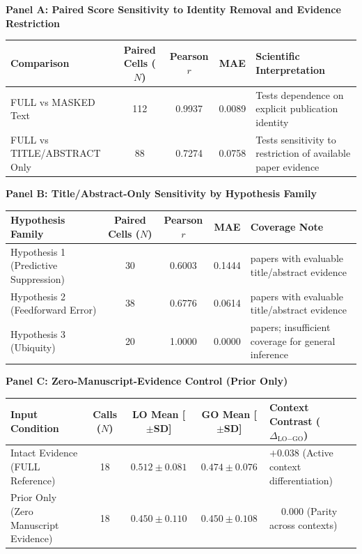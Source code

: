 \documentclass[12pt]{article}
\begin{document}
\vspace{1.5em}

\begingroup
\small
\noindent\textbf{Panel A: Paired Score Sensitivity to Identity Removal and Evidence Restriction}
\vspace{0.2em}

\noindent\begin{tabularx}{\textwidth}{@{}l c c c >{\raggedright\arraybackslash}X@{}}
\toprule
\textbf{Comparison} & \textbf{Paired Cells ($N$)} & \textbf{Pearson $r$} & \textbf{MAE} & \textbf{Scientific Interpretation} \\
\midrule
FULL vs MASKED Text & 112 & 0.9937 & 0.0089 & Tests dependence on explicit publication identity \\
FULL vs TITLE/ABSTRACT Only & 88 & 0.7274 & 0.0758 & Tests sensitivity to restriction of available paper evidence \\
\bottomrule
\end{tabularx}

\vspace{0.8em}
\noindent\textbf{Panel B: Title/Abstract-Only Sensitivity by Hypothesis Family}
\vspace{0.2em}

\noindent\begin{tabularx}{\textwidth}{@{}l c c c >{\raggedright\arraybackslash}X@{}}
\toprule
\textbf{Hypothesis Family} & \textbf{Paired Cells ($N$)} & \textbf{Pearson $r$} & \textbf{MAE} & \textbf{Coverage Note} \\
\midrule
Hypothesis 1 (Predictive Suppression) & 30 & 0.6003 & 0.1444 & 5 papers with evaluable title/abstract evidence \\
Hypothesis 2 (Feedforward Error) & 38 & 0.6776 & 0.0614 & 4 papers with evaluable title/abstract evidence \\
Hypothesis 3 (Ubiquity) & 20 & 1.0000 & 0.0000 & 2 papers; insufficient coverage for general inference \\
\bottomrule
\end{tabularx}

\vspace{0.8em}
\noindent\textbf{Panel C: Zero-Manuscript-Evidence Control (Prior Only)}
\vspace{0.2em}

\noindent\begin{tabularx}{\textwidth}{@{}l c c c >{\raggedright\arraybackslash}X@{}}
\toprule
\textbf{Input Condition} & \textbf{Calls ($N$)} & \textbf{LO Mean [$\pm$SD]} & \textbf{GO Mean [$\pm$SD]} & \textbf{Context Contrast ($\Delta_{\text{LO}-\text{GO}}$)} \\
\midrule
Intact Evidence (FULL Reference) & 18 & $0.512 \pm 0.081$ & $0.474 \pm 0.076$ & $+0.038$ (Active context differentiation) \\
Prior Only (Zero Manuscript Evidence) & 18 & $0.450 \pm 0.110$ & $0.450 \pm 0.108$ & $\phantom{+}0.000$ (Parity across contexts) \\
\bottomrule
\end{tabularx}
\endgroup
\vspace{0.4em}
\end{document}
